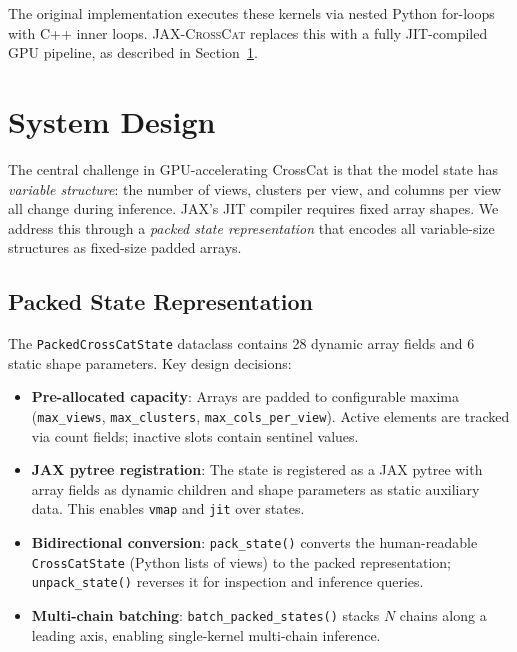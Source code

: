 \documentclass[11pt]{article}
\newcommand{\jaxcc}{\textsc{JAX-CrossCat}}
\begin{document}
The original implementation executes these kernels via nested Python
for-loops with C++ inner loops. \jaxcc{} replaces this with a fully
JIT-compiled GPU pipeline, as described in Section~\ref{sec:system}.

\section{System Design}
\label{sec:system}

The central challenge in GPU-accelerating CrossCat is that the model
state has \emph{variable structure}: the number of views, clusters per
view, and columns per view all change during inference. JAX's JIT
compiler requires fixed array shapes. We address this through a
\emph{packed state representation} that encodes all variable-size
structures as fixed-size padded arrays.

\subsection{Packed State Representation}

The \texttt{PackedCrossCatState} dataclass contains 28 dynamic array
fields and 6 static shape parameters. Key design decisions:

\begin{itemize}
  \item \textbf{Pre-allocated capacity}: Arrays are padded to
    configurable maxima (\texttt{max\_views}, \texttt{max\_clusters},
    \texttt{max\_cols\_per\_view}). Active elements are tracked via
    count fields; inactive slots contain sentinel values.
  \item \textbf{JAX pytree registration}: The state is registered as a
    JAX pytree with array fields as dynamic children and shape parameters
    as static auxiliary data. This enables \texttt{vmap} and \texttt{jit}
    over states.
  \item \textbf{Bidirectional conversion}: \texttt{pack\_state()} converts
    the human-readable \texttt{CrossCatState} (Python lists of views) to
    the packed representation; \texttt{unpack\_state()} reverses it for
    inspection and inference queries.
  \item \textbf{Multi-chain batching}: \texttt{batch\_packed\_states()}
    stacks $N$ chains along a leading axis, enabling single-kernel
    multi-chain inference.
\end{itemize}
\end{document}
